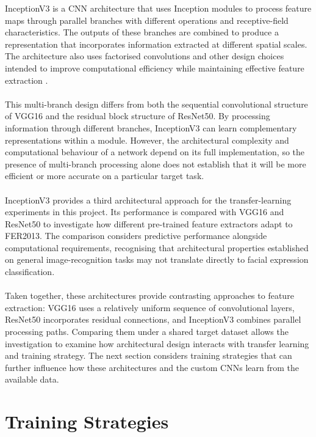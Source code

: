 \documentclass[12pt, a4paper]{report}
\let\oldsection\section
\renewcommand{\section}{%
    \Needspace{6\baselineskip}%
    \oldsection
}
\begin{document}
					InceptionV3 is a CNN architecture that uses Inception modules to process feature maps through parallel branches with different operations and receptive-field characteristics. The outputs of these branches are combined to produce a representation that incorporates information extracted at different spatial scales. The architecture also uses factorised convolutions and other design choices intended to improve computational efficiency while maintaining effective feature extraction \cite{szegedy2016inception}.\\\\
					This multi-branch design differs from both the sequential convolutional structure of VGG16 and the residual block structure of ResNet50. By processing information through different branches, InceptionV3 can learn complementary representations within a module. However, the architectural complexity and computational behaviour of a network depend on its full implementation, so the presence of multi-branch processing alone does not establish that it will be more efficient or more accurate on a particular target task.\\\\
					InceptionV3 provides a third architectural approach for the transfer-learning experiments in this project. Its performance is compared with VGG16 and ResNet50 to investigate how different pre-trained feature extractors adapt to FER2013. The comparison considers predictive performance alongside computational requirements, recognising that architectural properties established on general image-recognition tasks may not translate directly to facial expression classification.\\\\
					Taken together, these architectures provide contrasting approaches to feature extraction: VGG16 uses a relatively uniform sequence of convolutional layers, \\ResNet50 incorporates residual connections, and InceptionV3 combines parallel processing paths. Comparing them under a shared target dataset allows the investigation to examine how architectural design interacts with transfer learning and training strategy. The next section considers training strategies that can further influence how these architectures and the custom CNNs learn from the available data.
				
		\section{Training Strategies}
			
\end{document}
